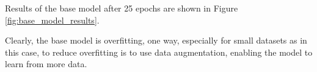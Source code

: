 Results of the base model after 25 epochs are shown in Figure \ref{fig:base_model_results}.

Clearly, the base model is overfitting, one way, especially for small datasets as in this case, to reduce overfitting is to use data augmentation, enabling the model to learn from more data.